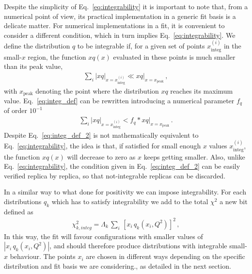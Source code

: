 %
Despite the simplicity of Eq.~\eqref{eq:integrability} it is important to note that, 
from a numerical point of view, its practical implementation in a generic fit basis is a delicate matter.
For numerical implementations in a fit, it is convenient to consider a different condition, which in turn implies
Eq.~\eqref{eq:integrability}.
%
We define the distribution $q$ to be integrable if, for a given set of points $x^{(i)}_{\text{integ}}$ in the small-$x$ region,
the function $xq\left(x\right)$ evaluated in these points is much smaller than its peak value,
\begin{align}
    \label{eq:integ_def}
    \sum_i|xq|_{x=x^{(i)}_{\text{integ}}} \ll xq|_{x=x_{\text{peak}}}\,,
\end{align}
with $x_{\text{peak}}$ denoting the point where the distribution $xq$ reaches its maximum value.
Eq.~\eqref{eq:integ_def} can be rewritten introducing a numerical parameter $f_q$ of order $10^{-1}$
\begin{align}
    \label{eq:integ_def_2}
    \sum_i|xq|_{x=x^{(i)}_{\text{integ}}} < f_q*xq|_{x=x_{\text{peak}}}\,.
\end{align}
Despite Eq.~\eqref{eq:integ_def_2} is not mathematically equivalent to Eq.~\eqref{eq:integrability},
 the idea is that,
if satisfied for small enough $x$ values $x^{(i)}_{\text{integ}}$, the function $xq\left(x\right)$ will 
decrease to zero as $x$ keeps getting smaller. Also, unlike Eq.~\eqref{eq:integrability}, the condition given
in Eq.~\eqref{eq:integ_def_2} can be easily verified replica by replica, so that not-integrable replicas can be discarded.

%
In a similar way to what done for positivity we can impose integrability. For each distributions $q_k$ which has to satisfy integrability we
add to the total $\chi^2$ a new bit defined as  
\begin{align}
	\label{eq:chi2integ_k}
	\chi^2_{k,integ} = \Lambda_k \,\sum_i \,\left[x_i\,q_k\left(x_i,Q^2\right)\right]^2\,,
\end{align}
In this way, the fit will favour configurations with smaller values of $|x_i\,q_k\left(x_i,Q^2\right)|$, and should 
therefore produce distributions with integrable small-$x$ behaviour. The points $x_i$ are chosen in different ways depending
on the specific distribution and fit basis we are considering., as detailed in the next section. 


